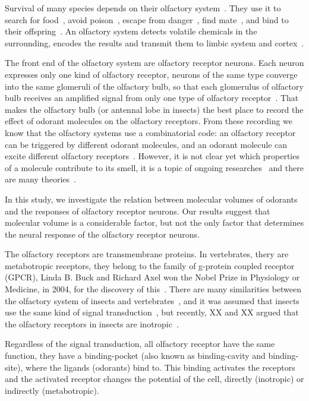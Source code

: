 \documentclass[11pt]{paper} %
\begin{document}
Survival of many species depends on their olfactory system~\cite{}. 
They use it  to search for food~\cite{}, 
avoid poison~\cite{}, 
escape from danger~\cite{}, 
find mate~\cite{}, 
and bind to their offspring~\cite{}.
An olfactory system detects volatile chemicals in the surrounding, 
encodes the results and transmit them to limbic system and cortex~\cite{}.

The front end of the olfactory system are olfactory receptor neurons. 
Each neuron expresses only one kind of olfactory receptor, 
neurons of the same type converge into the same glomeruli of the olfactory bulb,
so that each glomerulus of olfactory bulb receives an amplified signal from only one type of olfactory receptor~\cite{}.
That makes the olfactory bulb (or antennal lobe in insects) the best place to record the effect of odorant molecules on the olfactory receptors. 
From these recording we know that the olfactory systems use a combinatorial code: 
an olfactory receptor can be triggered by different odorant molecules, 
and an odorant molecule can excite different olfactory receptors~\cite{Malnic2000}.  
However, it is not clear yet which properties of a molecule contribute to its smell,
it is a topic of ongoing researches~\cite{} and there are many theories~\cite{}.

In this study, 
we investigate the relation between molecular volumes of odorants and the responses of olfactory receptor neurons. 
Our results suggest that molecular volume is a considerable factor, 
but not the only factor that determines the neural response of the olfactory receptor neurons.

The olfactory receptors are transmembrane proteins.
In vertebrates, thery are metabotropic receptors, they belong to the family of g-protein coupled receptor (GPCR), 
Linda B. Buck and Richard Axel won the Nobel Prize in Physiology or Medicine, in 2004, 
for the discovery of this~\cite{Buck1991}.
There are many similarities between the olfactory system of insects and vertebrates~\cite{Kaupp2010}, 
and it was assumed that insects use the same kind of signal transduction~\cite{}, 
but recently, XX and XX argued that the olfactory receptors in insects are inotropic~\cite{Sato2008,Wicher2008}. 

Regardless of the signal transduction, 
all olfactory receptor have the same function, they have a binding-pocket (also known as binding-cavity and binding-site),
where the ligands (odorants) bind to. 
This binding activates the receptors and
the activated receptor changes the potential of the cell, directly (inotropic) or indirectly (metabotropic).
\end{document}
